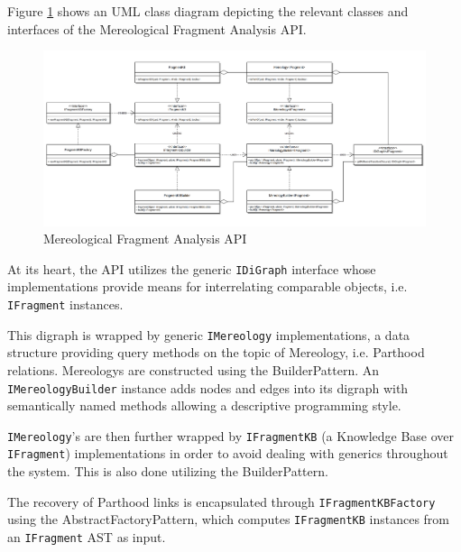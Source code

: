 Figure \ref{figure:MereologicalFragmentAnalysisAPI} shows an \gls{UML} class diagram depicting the relevant classes and interfaces of the Mereological Fragment Analysis \gls{API}.
\begin{figure}[h!]
\begin{center}
\includegraphics[width=\textwidth]{images/MereologicalFragmentAnalysisAPI.png}
\end{center}
\caption{Mereological Fragment Analysis API}
\label{figure:MereologicalFragmentAnalysisAPI}
\end{figure}
At its heart, the \gls{API} utilizes the generic \texttt{IDiGraph} interface whose implementations provide means for interrelating comparable objects, i.e. \texttt{IFragment} instances.

This digraph is wrapped by generic \texttt{IMereology} implementations, a data structure providing query methods on the topic of \gls{Mereology}, i.e. \gls{Parthood} relations.
\Glspl{Mereology} are constructed using the \gls{BuilderPattern}.
An \texttt{IMereology\-Builder} instance adds nodes and edges into its digraph with semantically named methods allowing a descriptive programming style.

\texttt{IMereology}'s are then further wrapped by \texttt{IFragmentKB} (a Knowledge Base over \texttt{IFragment}) implementations in order to avoid dealing with generics throughout the system.
This is also done utilizing the \gls{BuilderPattern}.

The recovery of \gls{Parthood} links is encapsulated through \texttt{IFragment\-KB\-Fac\-tory} using the \gls{AbstractFactoryPattern}, which computes \texttt{IFragmentKB} instances from an \texttt{IFragment} \gls{AST} as input.


